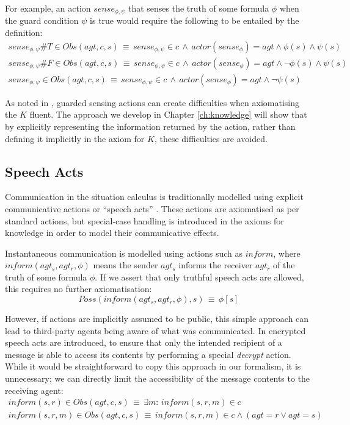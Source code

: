 For example, an action $sense_{\phi,\psi}$ that senses the truth
of some formula $\phi$ when the guard condition $\psi$ is true would
require the following to be entailed by the definition:\begin{gather*}
sense_{\phi,\psi}\#T\in Obs(agt,c,s)\,\equiv\, sense_{\phi,\psi}\in c\,\wedge\, actor(sense_{\phi})=agt\wedge\phi(s)\wedge\psi(s)\\
sense_{\phi,\psi}\#F\in Obs(agt,c,s)\,\equiv\, sense_{\phi,\psi}\in c\,\wedge\, actor(sense_{\phi})=agt\wedge\neg\phi(s)\wedge\psi(s)\\
sense_{\phi,\psi}\in Obs(agt,c,s)\,\equiv\, sense_{\phi,\psi}\in c\,\wedge\, actor(sense_{\phi})=agt\wedge\neg\psi(s)\end{gather*}


As noted in \citep{Petrick06thesis}, guarded sensing actions can
create difficulties when axiomatising the $K$ fluent. The approach
we develop in Chapter \ref{ch:knowledge} will show that by explicitly
representing the information returned by the action, rather than defining
it implicitly in the axiom for $K$, these difficulties are avoided.


\subsection{Speech Acts}

Communication in the situation calculus is traditionally modelled
using explicit communicative actions or {}``speech acts'' \citep{shapiro01casl_feat_inter,shapiro07sc_goal_change}.
These actions are axiomatised as per standard actions, but special-case
handling is introduced in the axioms for knowledge in order to model
their communicative effects.

Instantaneous communication is modelled using actions such as $inform$,
where $inform(agt_{s},agt_{r},\phi)$ means the sender $agt_{s}$
informs the receiver $agt_{r}$ of the truth of some formula $\phi$.
If we assert that only truthful speech acts are allowed, this requires
no further axiomatisation:\[
Poss(inform(agt_{s},agt_{r},\phi),s)\,\equiv\,\phi[s]\]


However, if actions are implicitly assumed to be public, this simple
approach can lead to third-party agents being aware of what was communicated.
In \citep{shapiro01casl_feat_inter} encrypted speech acts are introduced,
to ensure that only the intended recipient of a message is able to
access its contents by performing a special \emph{decrypt} action.
While it would be straightforward to copy this approach in our formalism,
it is unnecessary; we can directly limit the accessibility of the
message contents to the receiving agent:\begin{gather*}
inform(s,r)\in Obs(agt,c,s)\,\equiv\,\exists m:\, inform(s,r,m)\in c\\
inform(s,r,m)\in Obs(agt,c,s)\,\equiv\, inform(s,r,m)\in c\wedge\left(agt=r\vee agt=s\right)\end{gather*}


